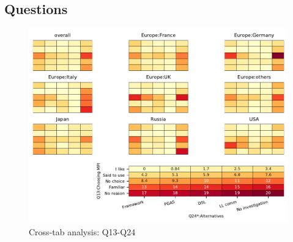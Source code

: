
\subsection{Questions}


\begin{figure}
\begin{center}
\includegraphics[width=12cm]{../pdfs/Q13-Q24.pdf}
\caption{Cross-tab analysis: Q13-Q24}
\label{fig:Q13-Q24}
\end{center}
\end{figure}
